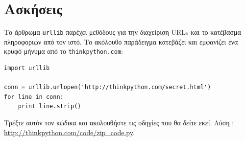 \documentclass[10pt]{book}
\begin{document}
\section{Ασκήσεις}

\begin{exercise}
\label{urllib}

Το άρθρωμα  {\tt urllib}  παρέχει μεθόδους για την διαχείριση  URLs  και το κατέβασμα πληροφοριών από τον ιστό. 
Το ακόλουθο παράδειγμα κατεβάζει και εμφανίζει ένα κρυφό μήνυμα από το  {\tt thinkpython.com}:

\begin{verbatim}
import urllib

conn = urllib.urlopen('http://thinkpython.com/secret.html')
for line in conn:
    print line.strip()
\end{verbatim}

 Τρέξτε αυτόν τον κώδικα και ακολουθήστε τις οδηγίες που θα δείτε εκεί. 
Λύση : \url{http://thinkpython.com/code/zip_code.py}.

\end{exercise}





%

\end{document}
